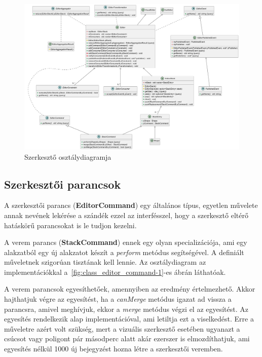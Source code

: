 \begin{figure}[H]
	\centering
	\includegraphics[width=1\linewidth]{images/class_editor.png}
	\caption{Szerkesztő osztálydiagramja}
	\label{fig:class_editor-1}
\end{figure}


\subsection{Szerkesztői parancsok}

A szerkesztői parancs (\textbf{EditorCommand}) egy általános típus, egyetlen művelete annak nevének lekérése a szándék ezzel az interfésszel, hogy a szerkesztő eltérő hatáskörű parancsokat is le tudjon kezelni.

A verem parancs (\textbf{StackCommand}) ennek egy olyan specializációja, ami egy alakzatból egy új alakzatot készít a \textit{perform} metódus segítségével. A definiált műveletnek szigorúan tisztának kell lennie. Az osztálydiagram az implementációkkal a~\ref{fig:class_editor_command-1}-es ábrán láthatóak.

A verem parancsok egyesíthetőek, amennyiben az eredmény értelmezhető. Akkor hajthatjuk végre az egyesítést, ha a \textit{canMerge} metódus igazat ad vissza a parancsra, amivel meghívjuk, ekkor a \textit{merge} metódus végzi el az egyesítést. Az egyesítés rendelkezik alap implementációval, ami letiltja ezt a viselkedést. Erre a műveletre azért volt szükség, mert a vizuális szerkesztő esetében ugyanazt a csúcsot vagy poligont pár másodperc alatt akár ezerszer is elmozdíthatjuk, ami egyesítés nélkül 1000 új bejegyzést hozna létre a szerkesztői veremben.

